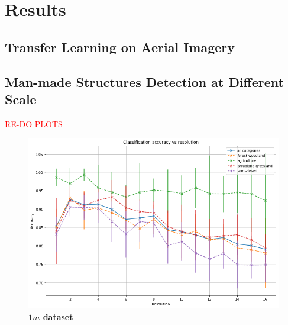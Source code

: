 
\chapter{Results} 

\label{Chapter5}


\section{Transfer Learning on Aerial Imagery}

\section{Man-made Structures Detection at Different Scale}

\textcolor{red}{RE-DO PLOTS}

\begin{figure}[h!]
	\centering
	\includegraphics[width=\textwidth]{Figures/results_1m_all_categories.png}
	\captionsetup{width=1\linewidth}
	\caption{\textbf{$1m$ dataset}}
	\label{fig:acc_1m_all_cat}
\end{figure}

